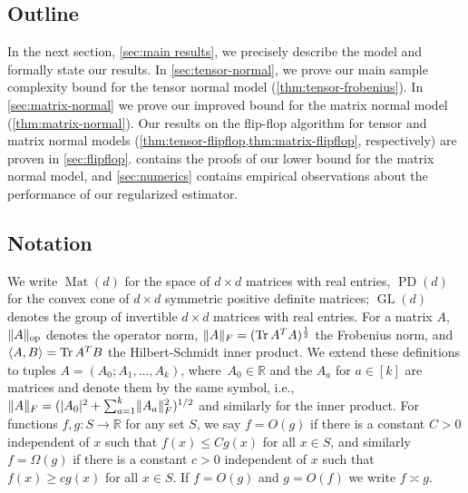 \documentclass[aos]{imsart}
\theoremstyle{definition}
\numberwithin{equation}{section}
\DeclareMathOperator{\op}{op}
\DeclareMathOperator{\Mat}{Mat}
\DeclareMathOperator{\GL}{GL}
\DeclareMathOperator{\tr}{Tr}
\DeclareMathOperator{\PD}{PD}
\DeclarePairedDelimiter{\abs}{\lvert}{\rvert}
\DeclarePairedDelimiter{\norm}{\lVert}{\rVert}
\newcommand{\R}{{\mathbb{R}}}
\newcommand{\MW}[1]{{\color{red}[MW: #1]}}
\newcommand{\MW}[1]{{}}
\begin{document}
\subsection{Outline}
In the next section, \cref{sec:main results}, we precisely describe the model and formally state our results.
In \cref{sec:tensor-normal}, we prove our main sample complexity bound for the tensor normal model (\cref{thm:tensor-frobenius}).
In \cref{sec:matrix-normal} we prove our improved bound for the matrix normal model (\cref{thm:matrix-normal}).
Our results on the flip-flop algorithm for tensor and matrix normal models (\cref{thm:tensor-flipflop,thm:matrix-flipflop}, respectively) are proven in \cref{sec:flipflop}.
 contains the proofs of our lower bound for the matrix normal model, and \cref{sec:numerics} contains empirical observations about the performance of our regularized estimator.

\subsection{Notation}
We write $\Mat(d)$ for the space of $d\times d$ matrices with real entries, $\PD(d)$ for the convex cone of $d\times d$ symmetric positive definite matrices; $\GL(d)$ denotes the group of invertible $d\times d$ matrices with real entries.
For a matrix $A$, $\norm{A}_{\op}$ denotes the operator norm, $\norm{A}_F = (\tr A^T A)^{\frac12}$ the Frobenius norm, and $\braket{A,B} = \tr A^T B$ the Hilbert-Schmidt inner product.
We extend these definitions to tuples $A=(A_0;A_1,\dots,A_k)$, where~$A_0\in\R$ and the $A_a$ for $a\in[k]$ are matrices and denote them by the same symbol, i.e., $\norm{A}_F = (\abs{A_0}^2 + \sum_{a=1}^k \norm{A_a}_F^2)^{1/2}$ and similarly for the inner product.
For functions $f,g:S \to \R$ for any set $S$, we say $f = O(g)$ if there is a constant $C > 0$ independent of $x$ such that $f(x) \leq C g(x)$ for all $x \in S$, and similarly $f = \Omega(g)$ if there is a constant $c > 0$ independent of $x$ such that $f(x) \geq c g(x)$ for all $x \in S$. If $f = O(g)$ and $g = O(f)$ we write $f \asymp g$.
\end{document}
